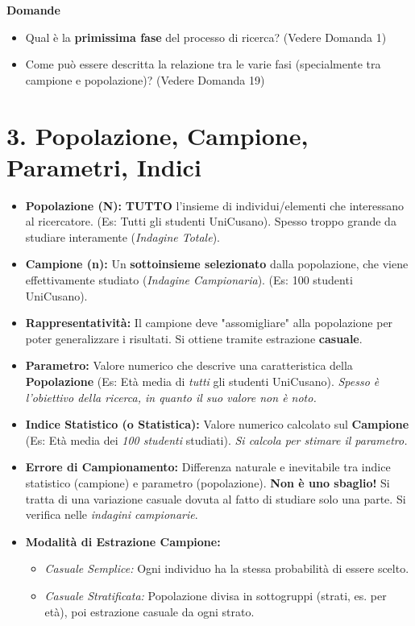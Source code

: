 \documentclass[12pt, a4paper]{article}
\newenvironment{reflectionbox}{%
    \medskip %
    \begin{framed}\par\noindent
    \textbf{\color{boxtitlecolor}Domande} \par
    \begin{itemize}[leftmargin=*, label=$\blacktriangleright$]
}{%
    \end{itemize}\par
    \end{framed}
    \medskip %
}
\begin{document}
\begin{reflectionbox}
    \item Qual è la \textbf{primissima fase} del processo di ricerca? (Vedere Domanda 1)
    \item Come può essere descritta la relazione tra le varie fasi (specialmente tra campione e popolazione)? (Vedere Domanda 19)
\end{reflectionbox}

\section*{3. Popolazione, Campione, Parametri, Indici}
\begin{itemize}
    \item \textbf{Popolazione (N):} \textbf{TUTTO} l'insieme di individui/elementi che interessano al ricercatore. (Es: Tutti gli studenti UniCusano). Spesso troppo grande da studiare interamente (\textit{Indagine Totale}).
    \item \textbf{Campione (n):} Un \textbf{sottoinsieme selezionato} dalla popolazione, che viene effettivamente studiato (\textit{Indagine Campionaria}). (Es: 100 studenti UniCusano).
    \item \textbf{Rappresentatività:} Il campione deve "assomigliare" alla popolazione per poter generalizzare i risultati. Si ottiene tramite estrazione \textbf{casuale}.
    \item \textbf{Parametro:} Valore numerico che descrive una caratteristica della \textbf{Popolazione} (Es: Età media di \textit{tutti} gli studenti UniCusano). \textit{Spesso è l'obiettivo della ricerca, in quanto il suo valore non è noto.}
    \item \textbf{Indice Statistico (o Statistica):} Valore numerico calcolato sul \textbf{Campione} (Es: Età media dei \textit{100 studenti} studiati). \textit{Si calcola per stimare il parametro.}
    \item \textbf{Errore di Campionamento:} Differenza naturale e inevitabile tra indice statistico (campione) e parametro (popolazione). \textbf{Non è uno sbaglio!} Si tratta di una variazione casuale dovuta al fatto di studiare solo una parte. Si verifica nelle \textit{indagini campionarie}.
    \item \textbf{Modalità di Estrazione Campione:}
        \begin{itemize}
            \item \textit{Casuale Semplice:} Ogni individuo ha la stessa probabilità di essere scelto.
            \item \textit{Casuale Stratificata:} Popolazione divisa in sottogruppi (strati, es. per età), poi estrazione casuale da ogni strato.
        \end{itemize}
\end{itemize}
\end{document}
